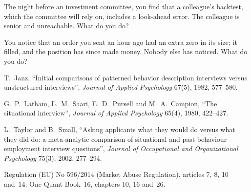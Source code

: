\begin{interviewq}\label{iq:iv:behavioural-and-fit:9}
The night before an investment committee, you find that a colleague's backtest, which the committee will rely on, includes a
look-ahead error. The colleague is senior and unreachable. What do you do?
\end{interviewq}

\begin{interviewq}\label{iq:iv:behavioural-and-fit:10}
You notice that an order you sent an hour ago had an extra zero in its size; it filled, and the position has since made money.
Nobody else has noticed. What do you do?
\end{interviewq}

\begin{omsources}
\item T.~Janz, ``Initial comparisons of patterned behavior description interviews versus unstructured interviews'', \emph{Journal
of Applied Psychology} 67(5), 1982, 577--580.
\item G.~P.~Latham, L.~M.~Saari, E.~D.~Pursell and M.~A.~Campion, ``The situational interview'', \emph{Journal of Applied
Psychology} 65(4), 1980, 422--427.
\item L.~Taylor and B.~Small, ``Asking applicants what they would do versus what they did do: a meta-analytic comparison of
situational and past behaviour employment interview questions'', \emph{Journal of Occupational and Organizational Psychology}
75(3), 2002, 277--294.
\item Regulation (EU) No 596/2014 (Market Abuse Regulation), articles 7, 8, 10 and~14; One Quant Book~16, chapters 10, 16 and~26.
\end{omsources}
